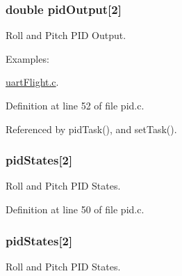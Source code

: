 \hypertarget{group__pid_ga5b70790e470e0c5812d24a8a098c01e0}{
\subsubsection[{pid\-Output}]{\setlength{\rightskip}{0pt plus 5cm}double pid\-Output\mbox{[}2\mbox{]}}}\label{group__pid_ga5b70790e470e0c5812d24a8a098c01e0}


Roll and Pitch P\-I\-D Output. 

\begin{Desc}
\item[Examples\-: ]\par
\hyperlink{uart_flight_8c-example}{uart\-Flight.\-c}.\end{Desc}


Definition at line 52 of file pid.\-c.



Referenced by pid\-Task(), and set\-Task().

\hypertarget{group__pid_ga9ce36f9a8e0e12e30b448e0161e3e5ec}{
\subsubsection[{pid\-States}]{ pid\-States\mbox{[}2\mbox{]}}}\label{group__pid_ga9ce36f9a8e0e12e30b448e0161e3e5ec}


Roll and Pitch P\-I\-D States. 



Definition at line 50 of file pid.\-c.

\hypertarget{group__pid_ga9ce36f9a8e0e12e30b448e0161e3e5ec}{
\subsubsection[{pid\-States}]{ pid\-States\mbox{[}2\mbox{]}}}\label{group__pid_ga9ce36f9a8e0e12e30b448e0161e3e5ec}


Roll and Pitch P\-I\-D States. 

